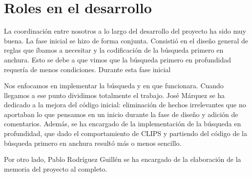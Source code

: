 \documentclass[11pt,a4paper,final]{article}
\begin{document}
\newpage

\section{Roles en el desarrollo}
La coordinación entre nosotros a lo largo del desarrollo del proyecto ha sido muy buena. La fase inicial se hizo de forma conjunta. Consistió en el diseño general de reglas que íbamos a necesitar y la codificación de la búsqueda primero en anchura. Esto se debe a que vimos que la búsqueda primero en profundidad requería de menos condiciones. Durante esta fase inicial 

Nos enfocamos en implementar la búsqueda y en que funcionara. Cuando llegamos a ese punto dividimos totalmente el trabajo. José Márquez se ha dedicado a la mejora del código inicial: eliminación de hechos irrelevantes que no aportaban lo que pensamos en un inicio durante la fase de diseño y adición de comentarios. Además, se ha encargado de la implementación de la búsqueda en profundidad, que dado el comportamiento de CLIPS y partiendo del código de la búsqueda primero en anchura resultó más o menos sencillo.

Por otro lado, Pablo Rodríguez Guillén se ha encargado de la elaboración de la memoria del proyecto al completo.

\clearpage



	
\end{document}
